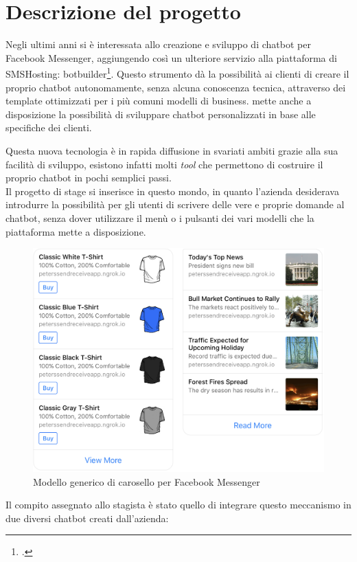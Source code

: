 \section{Descrizione del progetto}
Negli ultimi anni \azienda{} si è interessata allo creazione e sviluppo di \gls{chatbot} per Facebook Messenger, aggiungendo così un ulteriore servizio alla piattaforma di SMSHosting: botbuilder\footcite{botbuilder}. Questo strumento dà la possibilità ai clienti di creare il proprio \gls{chatbot} autonomamente, senza alcuna conoscenza tecnica, attraverso dei template ottimizzati per i più comuni modelli di business. \azienda{} mette anche a disposizione la possibilità di sviluppare \gls{chatbot} personalizzati in base alle specifiche dei clienti. 

Questa nuova tecnologia è in rapida diffusione in svariati ambiti grazie alla sua facilità di sviluppo, esistono infatti molti \emph{tool} che permettono di costruire il proprio \gls{chatbot} in pochi semplici passi.\\
Il progetto di stage si inserisce in questo mondo, in quanto l'azienda desiderava introdurre la possibilità per gli utenti di scrivere delle vere e proprie domande al \gls{chatbot}, senza dover utilizzare il menù o i pulsanti dei vari modelli che la piattaforma mette a disposizione.
\begin{figure}[h]
	\centering
	\includegraphics[scale=0.2]{../Immagini/modello_lista.png}
	\caption{Modello generico di carosello per Facebook Messenger}
\end{figure}
\newpage
Il compito assegnato allo stagista è stato quello di integrare questo meccanismo in due diversi \gls{chatbot} creati dall'azienda:
